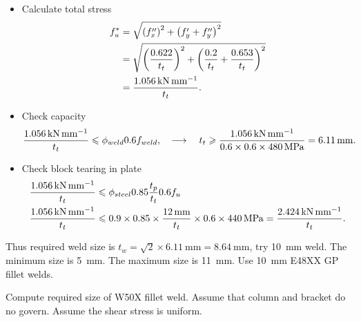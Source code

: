 \begin{solution}
\begin{itemize}
\item Calculate total stress
\begin{align*}
f_{u}^*&=\sqrt{\left(f''_x\right)^2+\left(f'_y+f''_y\right)^2}\\
&=\sqrt{\left(\dfrac{0.622}{t_t}\right)^2+\left(\dfrac{0.2}{t_t}+\dfrac{0.653}{t_t}\right)^2}\\
&=\dfrac{\SI{1.056}{\kilo\newton\per\milli\meter}}{t_t}.
\end{align*}
\item Check capacity
\begin{gather*}
\dfrac{\SI{1.056}{\kilo\newton\per\milli\meter}}{t_t}\leqslant\phi_{weld}0.6f_{weld},\quad\longrightarrow\quad
t_t\geqslant\dfrac{\SI{1.056}{\kilo\newton\per\milli\meter}}{0.6\times0.6\times\SI{480}{\mega\pascal}}=\SI{6.11}{\milli\meter}.
\end{gather*}
\item Check block tearing in plate
\begin{align*}
\dfrac{\SI{1.056}{\kilo\newton\per\milli\meter}}{t_t}&\leqslant\phi_{steel}0.85\dfrac{t_p}{t_t}0.6f_u\\
\dfrac{\SI{1.056}{\kilo\newton\per\milli\meter}}{t_t}&\leqslant0.9\times0.85\times\dfrac{\SI{12}{\milli\meter}}{t_t}\times0.6\times\SI{440}{\mega\pascal}=\dfrac{\SI{2.424}{\kilo\newton\per\milli\meter}}{t_t}.
\end{align*}
\end{itemize}
Thus required weld size is $t_w=\sqrt{2}\times\SI{6.11}{\mm}=\SI{8.64}{\mm}$, try \SI{10}{\mm} weld. The minimum size is \SI{5}{\mm}. The maximum size is \SI{11}{\mm}. Use \SI{10}{\mm} E48XX GP fillet welds.
\end{solution}
\begin{exmp}
Compute required size of W50X fillet weld. Assume that column and bracket do no govern. Assume the shear stress is uniform.
\begin{figure}[H]

\end{figure}
\end{exmp}
